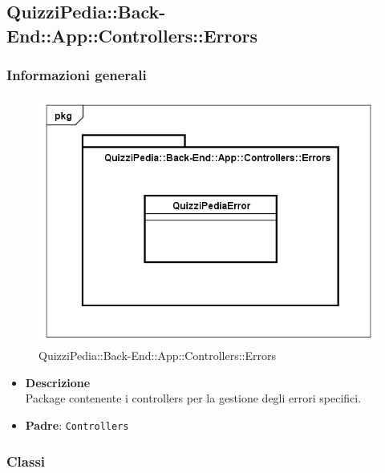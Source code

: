 \subsection{QuizziPedia::Back-End::App::Controllers::Errors}
\subsubsection{Informazioni generali}
\label{QuizziPedia::Back-End::App::Controllers::Errors}
\begin{figure}[ht]
	\centering
	\includegraphics[scale=0.45]{UML/Package/QuizziPedia_Back-End_App_Controllers_Errors.png}
	\caption{QuizziPedia::Back-End::App::Controllers::Errors}
\end{figure}
\FloatBarrier
	\begin{itemize}
		\item \textbf{Descrizione} \\
		Package contenente i controllers per la gestione degli errori specifici.
		\item \textbf{Padre}: \texttt{Controllers}
	\end{itemize}
\subsubsection{Classi}
